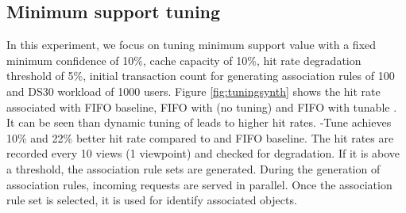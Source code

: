     


    \subsection{Minimum support tuning}
        In this experiment, we focus on tuning minimum support value with a fixed minimum confidence of 10\%, cache capacity of 10\%, hit rate degradation threshold of 5\%, initial transaction count for generating association rules of 100 and DS30 workload of 1000 users. Figure \ref{fig:tuningsynth} shows the hit rate associated with FIFO baseline, FIFO with \spaarc{} (no tuning) and FIFO with tunable \spaarc{}. It can be seen than dynamic tuning of \spaarc{} leads to higher hit rates. %
        \spaarc{}-Tune achieves 10\% and 22\% better hit rate compared to \spaarc{} and FIFO baseline. The hit rates are recorded every 10 views (1 viewpoint) and checked for degradation. If it is above a threshold, the association rule sets are generated. During the generation of association rules, incoming requests are served in parallel. Once the association rule set is selected, it is used for identify associated objects.
        
